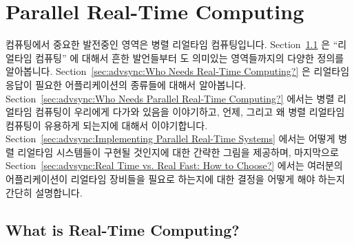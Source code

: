 
\section{Parallel Real-Time Computing}
\label{sec:advsync:Parallel Real-Time Computing}
%

컴퓨팅에서 중요한 발전중인 영역은 병렬 리얼타임 컴퓨팅입니다.
Section~\ref{sec:advsync:What is Real-Time Computing?}
은 ``리얼타임 컴퓨팅'' 에 대해서 흔한 발언들부터 도 의미있는 영역들까지의
다양한 정의를 알아봅니다.
Section~\ref{sec:advsync:Who Needs Real-Time Computing?}
은 리얼타임 응답이 필요한 어플리케이션의 종류들에 대해서 알아봅니다.
Section~\ref{sec:advsync:Who Needs Parallel Real-Time Computing?}
에서는 병렬 리얼타임 컴퓨팅이 우리에게 다가와 있음을 이야기하고, 언제, 그리고
왜 병렬 리얼타임 컴퓨팅이 유용하게 되는지에 대해서 이야기합니다.
Section~\ref{sec:advsync:Implementing Parallel Real-Time Systems}
에서는 어떻게 병렬 리얼타임 시스템들이 구현될 것인지에 대한 간략한 그림을
제공하며, 마지막으로
Section~\ref{sec:advsync:Real Time vs. Real Fast: How to Choose?}
에서는 여러분의 어플리케이션이 리얼타임 장비들을 필요로 하는지에 대한 결정을
어떻게 해야 하는지 간단히 설명합니다.

\subsection{What is Real-Time Computing?}
\label{sec:advsync:What is Real-Time Computing?}

